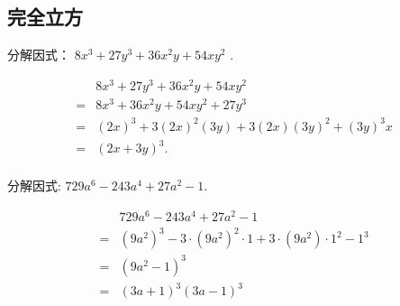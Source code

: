\subsection{完全立方}
\begin{example}
	分解因式： $8 x^{3}+27 y^{3}+36 x^{2} y+54 x y^{2}$ .
\end{example}
\begin{solution}
	\begin{align*}
		  & 8 x^{3}+27 y^{3}+36 x^{2} y+54 x y^{2}                \\
		= & 8 x^{3}+36 x^{2} y+54 x y^{2}+27 y^{3}                \\
		= & (2 x)^{3}+3(2 x)^{2}(3 y)+3(2 x)(3 y)^{2}+(3 y)^{3} x \\
		= & (2 x+3 y)^{3} .                                       \\
	\end{align*}
\end{solution}

\begin{example}
	分解因式: $729 a^{6}-243 a^{4}+27 a^{2}-1$.
\end{example}
\begin{solution}
	\begin{align*}
		  & 729 a^{6}-243 a^{4}+27 a^{2}-1                                                                                 \\
		= & \left(9 a^{2}\right)^{3}-3 \cdot\left(9 a^{2}\right)^{2} \cdot 1+3 \cdot\left(9 a^{2}\right) \cdot 1^{2}-1^{3} \\
		= & \left(9 a^{2}-1\right)^{3}                                                                                     \\
		= & (3 a+1)^{3}(3 a-1)^{3}
	\end{align*}
\end{solution}

